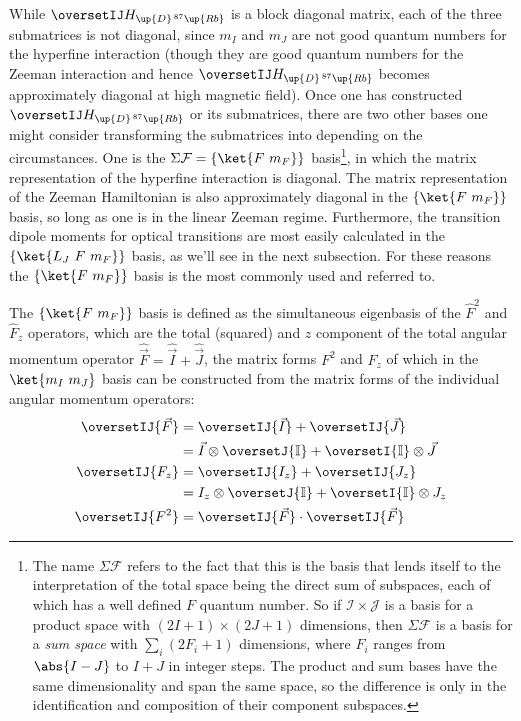 While $\oversetIJ H_{\up{D}\,^{87}\up{Rb}}$ is a block diagonal matrix, each of the three submatrices is not diagonal, since $m_I$ and $m_J$ are not good quantum numbers for the hyperfine interaction (though they are good quantum numbers for the Zeeman interaction and hence $\oversetIJ  H_{\up{D}\,^{87}\up{Rb}}$ becomes approximately diagonal at high magnetic field). Once one has constructed $\oversetIJ  H_{\up{D}\,^{87}\up{Rb}}$ or its submatrices, there are two other bases one might consider transforming the submatrices into depending on the circumstances. One is the $\Sigma\mathcal{F} = \{\ket{F\ m_F}\}$ basis\footnote{The name $\Sigma\mathcal{F}$ refers to the fact that this is the basis that lends itself to the interpretation of the total space being the direct sum of subspaces, each of which has a well defined $F$ quantum number. So if $\mathcal{I}\times\mathcal{J}$ is a basis for a product space with $(2I+1)\times(2J+1)$ dimensions, then $\Sigma \mathcal{F}$ is a basis for a \emph{sum space} with $\sum_i (2F_i + 1)$ dimensions, where $F_i$ ranges from $\abs{I-J}$ to $I+J$ in integer steps. The product and sum bases have the same dimensionality and span the same space, so the difference is only in the identification and composition of their component subspaces.}, in which the matrix representation of the hyperfine interaction is diagonal. The matrix representation of the Zeeman Hamiltonian is also approximately diagonal in the $\{\ket{F\ m_F}\}$ basis, so long as one is in the linear Zeeman regime. Furthermore, the transition dipole moments for optical transitions are most easily calculated in the $\{\ket{L_J\ F\ m_F}\}$ basis, as we'll see in the next subsection. For these reasons the $\{\ket{F\ m_F}\}$ basis is the most commonly used and referred to.

The $\{\ket{F\ m_F}\}$ basis is defined as the simultaneous eigenbasis of the $\hat F^2$ and $\hat F_z$ operators, which are the total (squared) and $z$ component of the total angular momentum operator $\hat{\vec{F}} = \hat{\vec{I}} + \hat{\vec{J}}$, the matrix forms $F^2$ and $F_z$ of which in the $\ket{m_I\ m_J}$ basis can be constructed from the matrix forms of the individual angular momentum operators:
\begin{align}
\oversetIJ{\vec F} &= \oversetIJ{\vec I} + \oversetIJ{\vec J}\nonumber\\
& = \vec I \otimes \oversetJ{\mathbb{I}} + \oversetI{\mathbb{I}} \otimes \vec J\\
\oversetIJ{F_z} &= \oversetIJ {I_z} + \oversetIJ {J_z}\nonumber\\
& = I_z \otimes \oversetJ{\mathbb{I}} + \oversetI{\mathbb{I}} \otimes J_z\\
\oversetIJ {F^2} &= \oversetIJ{\vec F}\cdot\oversetIJ{\vec F}
\end{align}

